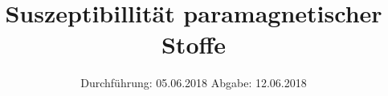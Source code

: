 

\subject{VERSUCH 606}
\title{Suszeptibillität paramagnetischer Stoffe}
\date{%
  Durchführung: 05.06.2018
  \hspace{3em}
  Abgabe: 12.06.2018
}



\maketitle
\thispagestyle{empty}
\tableofcontents
\newpage







\printbibliography{}


